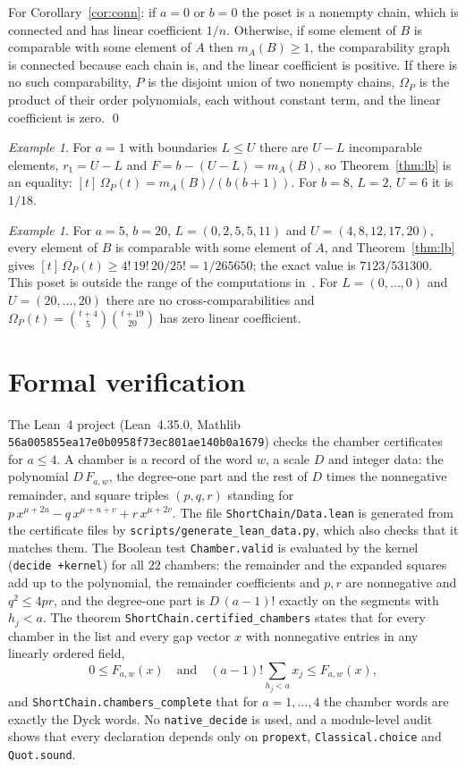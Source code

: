 \documentclass[11pt]{article}
\theoremstyle{definition}
\theoremstyle{remark}
\newtheorem{example}[theorem]{Example}
\begin{document}
For Corollary~\ref{cor:conn}: if $a=0$ or $b=0$ the poset is a nonempty
chain, which is connected and has linear coefficient $1/n$. Otherwise,
if some element of $B$ is comparable with some element of $A$ then
$m_A(B)\ge1$, the comparability graph is connected because each chain
is, and the linear coefficient is positive. If there is no such
comparability, $P$ is the disjoint union of two nonempty chains,
$\Omega_P$ is the product of their order polynomials, each without
constant term, and the linear coefficient is zero. \qed

\begin{example}\label{ex:a1}
For $a=1$ with boundaries $L\le U$ there are $U-L$ incomparable elements,
$r_1=U-L$ and $F=b-(U-L)=m_A(B)$, so Theorem~\ref{thm:lb} is an equality:
$[t]\,\Omega_P(t)=m_A(B)/(b(b+1))$. For $b=8$, $L=2$, $U=6$ it is $1/18$.
\end{example}

\begin{example}
For $a=5$, $b=20$, $L=(0,2,5,5,11)$ and $U=(4,8,12,17,20)$, every element
of $B$ is comparable with some element of $A$, and Theorem~\ref{thm:lb}
gives $[t]\,\Omega_P(t)\ge4!\,19!\,20/25!=1/265650$; the exact value is
$7123/531300$. This poset is outside the range of the computations
in~\cite{FMP}. For $L=(0,\dots,0)$ and $U=(20,\dots,20)$ there are no
cross-comparabilities and $\Omega_P(t)=\binom{t+4}5\binom{t+19}{20}$ has
zero linear coefficient.
\end{example}

\section{Formal verification}\label{sec:lean}

The Lean~4 project (Lean~4.35.0, Mathlib
\texttt{56a005855ea17e0b0958}\allowbreak\texttt{f73ec801ae140b0a1679}) checks the chamber
certificates for $a\le4$. A chamber is a record of the word $w$, a
scale $D$ and integer data: the polynomial $D\,F_{a,w}$, the degree-one
part and the rest of $D$ times the nonnegative remainder, and square
triples $(p,q,r)$ standing for $p\,x^{\mu+2u}-q\,x^{\mu+u+v}+r\,x^{\mu+2v}$.
The file \texttt{ShortChain/Data.lean} is generated from the certificate
files by \texttt{scripts/}\allowbreak\texttt{generate\_}\allowbreak\texttt{lean\_}\allowbreak\texttt{data.py}, which also checks
that it matches them. The Boolean test \texttt{Chamber.valid} is
evaluated by the kernel (\texttt{decide +kernel}) for all $22$ chambers:
the remainder and the expanded squares add up to the polynomial, the
remainder coefficients and $p,r$ are nonnegative and $q^2\le4pr$, and
the degree-one part is $D\,(a-1)!$ exactly on the segments with
$h_j<a$. The theorem \texttt{ShortChain.}\allowbreak\texttt{certified\_chambers} states that
for every chamber in the list and every gap vector $x$ with nonnegative
entries in any linearly ordered field,
\[
0\le F_{a,w}(x)\quad\text{and}\quad (a-1)!\sum_{h_j<a}x_j\le F_{a,w}(x),
\]
and \texttt{ShortChain.chambers\_complete} that for $a=1,\dots,4$ the
chamber words are exactly the Dyck words. No \texttt{native\_decide}
is used, and a module-level audit shows that every declaration depends
only on \texttt{propext}, \texttt{Classical.choice} and
\texttt{Quot.sound}.
\end{document}
